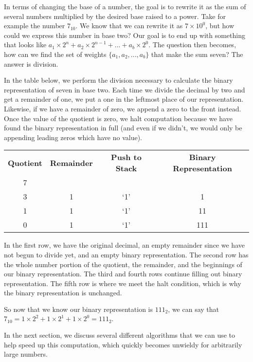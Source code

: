 \documentclass[12pt]{article}
\begin{document}
\par In terms of changing the base of a number, the goal is to rewrite it as the sum of several numbers multiplied by the desired base raised to a power. Take for example the number $7_{10}$. We know that we can rewrite it as $7\times10^0$, but how could we express this number in base two? Our goal is to end up with something that looks like $a_1\times2^{n} + a_2\times2^{n-1} + ... + a_b\times2^0$. The question then becomes, how can we find the set of weights $\{a_1, a_2, ..., a_b\}$ that make the sum seven? The answer is division.

\par In the table below, we perform the division necessary to calculate the binary representation of seven in base two. Each time we divide the decimal by two and get a remainder of one, we put a one in the leftmost place of our  representation. Likewise, if we have a remainder of zero, we append a zero to the front instead. Once the value of the quotient is zero, we halt computation because we have found the binary representation in full (and even if we didn't, we would only be appending leading zeros which have no value).

\begin{center}
  \begin{tabular}{c|c|c|c}
    \textbf{Quotient} & \textbf{Remainder} & \textbf{Push to Stack} & \textbf{Binary Representation} \\
    7 &   &     & \\
    3 & 1 & `1' & 1 \\
    1 & 1 & `1' & 11 \\
    0 & 1 & `1' & 111
  \end{tabular}
\end{center}

\par In the first row, we have the original decimal, an empty remainder since we have not begun to divide yet, and an empty binary representation. The second row has the whole number portion of the quotient, the remainder, and the beginnings of our binary representation. The third and fourth rows continue filling out binary representation. The fifth row is where we meet the halt condition, which is why the binary representation is unchanged.

\par So now that we know our binary representation is $111_2$, we can say that $7_{10} = 1\times2^2+1\times2^1+1\times2^0 = 111_2$.

\par In the next section, we discuss several different algorithms that we can use to help speed up this computation, which quickly becomes unwieldy for arbitrarily large numbers.
\end{document}
